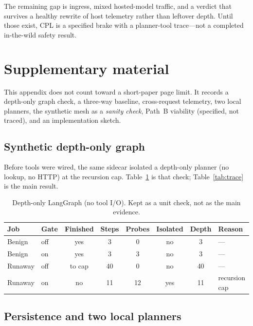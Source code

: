 \documentclass{article}
\begin{document}
The remaining gap is ingress, mixed hosted-model traffic, and a verdict that survives a healthy rewrite of host telemetry rather than leftover depth.
Until those exist, CPL is a specified brake with a planner-tool trace---not a completed in-the-wild safety result.

\clearpage



\appendix
\section{Supplementary material}
\label{app:supp}

This appendix does not count toward a short-paper page limit.
It records a depth-only graph check, a three-way baseline, cross-request telemetry, two local planners, the synthetic mesh as a \emph{sanity check}, Path~B viability (specified, not traced), and an implementation sketch.

\subsection{Synthetic depth-only graph}
\label{app:synth-depth}

Before tools were wired, the same sidecar isolated a depth-only planner (no lookup, no HTTP) at the recursion cap.
Table~\ref{tab:synth-depth} is that check; Table~\ref{tab:trace} is the main result.

\begin{table}[h]
\centering
\caption{Depth-only LangGraph (no tool I/O). Kept as a unit check, not as the main evidence.}
\label{tab:synth-depth}
\centering
\setlength{\tabcolsep}{3.2pt}
{\scriptsize
\begin{tabular}{llcccccl}
\toprule
Job & Gate & Finished & Steps & Probes & Isolated & Depth & Reason \\
\midrule
Benign & off & yes & 3 & 0 & no & 3 & --- \\
Benign & on & yes & 3 & 3 & no & 3 & --- \\
Runaway & off & to cap & 40 & 0 & no & 40 & --- \\
Runaway & on & no & 11 & 12 & yes & 11 & recursion cap \\
\bottomrule
\end{tabular}
}
\end{table}

\subsection{Persistence and two local planners}
\label{app:persist}
\end{document}
